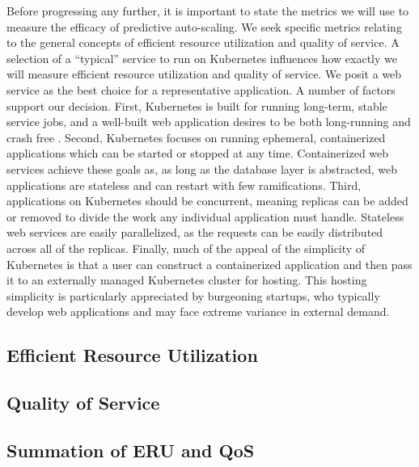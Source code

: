 Before progressing any further, it is important to state the metrics we will use
to measure the efficacy of predictive auto-scaling. We seek specific metrics relating to
the general concepts of efficient resource utilization and quality of service.
A selection of a ``typical'' service to run on Kubernetes influences how exactly
we will measure efficient resource utilization and quality of service. We posit
a web service as the best choice for a representative application. A number
of factors support our decision. First, Kubernetes is built for running
long-term, stable service jobs, and a well-built web application desires to be
both long-running and crash free \cite{k8s-design-overview}. Second, Kubernetes
focuses on running ephemeral, containerized applications which can be started or
stopped at any time. Containerized web services achieve these goals as, as
long as the database layer is abstracted, web applications are stateless and can
restart with few ramifications. Third, applications on Kubernetes should be
concurrent, meaning replicas can be added or removed to divide the work any
individual application must handle. Stateless web services are easily
parallelized, as the requests can be easily distributed across all of the
replicas. Finally, much of the appeal of the simplicity of Kubernetes is that a
user can construct a containerized application and then pass it to an
externally managed Kubernetes cluster for hosting. This hosting simplicity is
particularly appreciated by burgeoning startups, who typically develop web
applications and may face extreme variance in external demand.

\subsection{Efficient Resource Utilization}



\subsection{Quality of Service}



\subsection{Summation of ERU and QoS}


